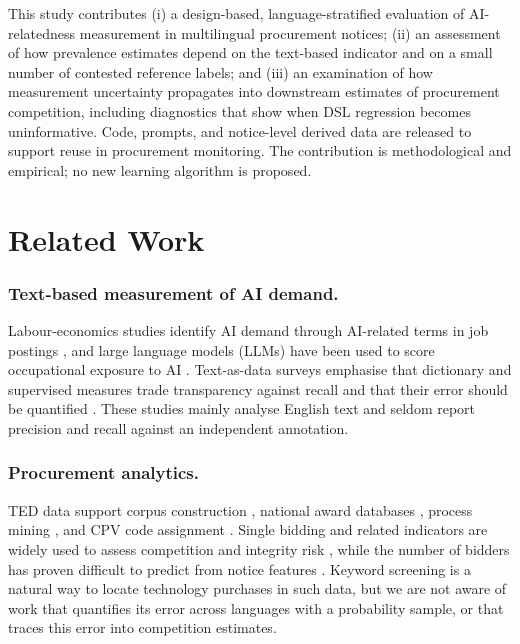 \documentclass[runningheads]{llncs}
\begin{document}
This study contributes (i) a design-based, language-stratified evaluation of AI-relatedness measurement in multilingual procurement notices; (ii) an assessment of how prevalence estimates depend on the text-based indicator and on a small number of contested reference labels; and (iii) an examination of how measurement uncertainty propagates into downstream estimates of procurement competition, including diagnostics that show when DSL regression becomes uninformative. Code, prompts, and notice-level derived data are released %
to support reuse in procurement monitoring. The contribution is methodological and empirical; no new learning algorithm is proposed.

\section{Related Work}
\subsubsection{Text-based measurement of AI demand.} Labour-economics studies identify AI demand through AI-related terms in job postings \cite{acemoglu2022,babina2024}, and large language models (LLMs) have been used to score occupational exposure to AI \cite{eloundou2024}. Text-as-data surveys emphasise that dictionary and supervised measures trade transparency against recall and that their error should be quantified \cite{gentzkow2019}. These studies mainly analyse English text and seldom report precision and recall against an independent annotation.

\subsubsection{Procurement analytics.} TED data support corpus construction \cite{ahmia2018}, national award databases \cite{potin2023}, process mining \cite{nai2023}, and CPV code assignment \cite{siciliani2023}. Single bidding and related indicators are widely used to assess competition and integrity risk \cite{fazekas2016,decarolis2022}, while the number of bidders has proven difficult to predict from notice features \cite{lozamencia2013}. Keyword screening is a natural way to locate technology purchases in such data, but we are not aware of work that quantifies its error across languages with a probability sample, or that traces this error into competition estimates.
\end{document}
